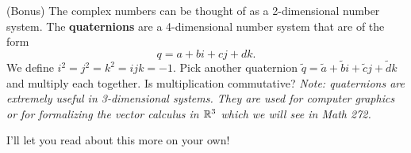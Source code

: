 \documentclass[12pt]{article} %
\begin{document}
\begin{problem}
(Bonus) The complex numbers can be thought of as a 2-dimensional number system. The \textbf{quaternions} are a 4-dimensional number system that are of the form
\[
q = a+bi+cj+dk.
\]
We define $i^2=j^2=k^2=ijk=-1$. Pick another quaternion $\tilde{q}=\tilde{a}+\tilde{b}i+\tilde{c}j+\tilde{d}k$ and multiply each together. Is multiplication commutative? \emph{Note: quaternions are extremely useful in 3-dimensional systems. They are used for computer graphics or for formalizing the vector calculus in $\mathbb{R}^3$ which we will see in Math 272.}
\end{problem}
\begin{solution}
I'll let you read about this more on your own!
\end{solution}
\end{document}
